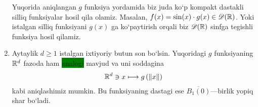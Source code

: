 \begin{example}
\begin{enumerate}
\begin{minipage}{0.89\textwidth}
\begin{minipage}[b]{0.45\textwidth}
\begin{figure}[H]
        \end{figure}
    \end{minipage}
    \end{minipage}
\break
Yuqorida aniqlangan $g$ funksiya yordamida biz juda ko`p kompakt dastakli sil\-liq funksiyalar hosil qila olamiz. Masalan, $f(x)=\sin(x)\cdot g(x)\in\mathscr{D}(\mathbb{R})$. Yoki istalgan silliq funksiyani $g(x)$ ga ko`paytirish orqali biz $\mathscr{D}(\mathbb{R})$ sinfga tegishli funksiya hosil qilamiz.
\item Aytaylik $d\ge 1$ istalgan ixtiyoriy butun son bo`lsin. Yuqoridagi $g$ funksiyaning ${\mathbb{R}^{d}}$ fazoda ham \colorbox{green}{analogi} mavjud va uni soddagina 
\begin{align*}
    {\mathbb{R}^{d}} \ni x\longmapsto g\left(\lVert x\rVert\right)
\end{align*}
kabi aniqlashimiz mumkin. Bu funksiyaning dastagi ese $\overline{B_1(0)}$---birlik yopiq shar bo`ladi.
\end{enumerate}
\end{example}

 
